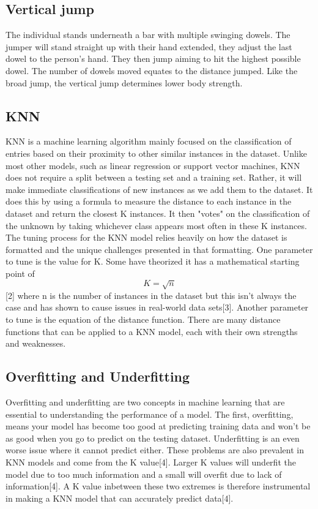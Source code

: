 \documentclass[confrence]{IEEEtran}
\begin{document}
\subsection*{Vertical jump}
The individual stands underneath a bar with multiple swinging dowels.
The jumper will stand straight up with their hand extended, they adjust the last dowel to the person's hand.
They then jump aiming to hit the highest possible dowel.
The number of dowels moved equates to the distance jumped.
Like the broad jump, the vertical jump determines lower body strength.
\subsection*{KNN}
KNN is a machine learning algorithm mainly focused on the classification of entries based on their proximity to other similar instances in the dataset.
Unlike most other models, such as linear regression or support vector machines, KNN does not require a split between a testing set and a training set.
Rather, it will make immediate classifications of new instances as we add them to the dataset.
It does this by using a formula to measure the distance to each instance in the dataset and return the closest K instances. It then "votes" on the classification of the unknown by taking whichever class appears most often in these K instances.
The tuning process for the KNN model relies heavily on how the dataset is formatted and the unique challenges presented in that formatting.
One parameter to tune is the value for K.
Some have theorized it has a mathematical starting point of \[K = \sqrt{n}\][2] where n is the number of instances in the dataset but this isn't always the case and has shown to cause issues in real-world data sets[3].
Another parameter to tune is the equation of the distance function.
There are many distance functions that can be applied to a KNN model, each with their own strengths and weaknesses.
\subsection*{Overfitting and Underfitting}
Overfitting and underfitting are two concepts in machine learning that are essential to understanding the performance of a model.
The first, overfitting, means your model has become too good at predicting training data and won't be as good when you go to predict on the testing dataset.
Underfitting is an even worse issue where it cannot predict either. These problems are also prevalent in KNN models and come from the K value[4].
Larger K values will underfit the model due to too much information and a small will overfit due to lack of information[4].
A K value inbetween these two extremes is therefore instrumental in making a KNN model that can accurately predict data[4].
\end{document}
